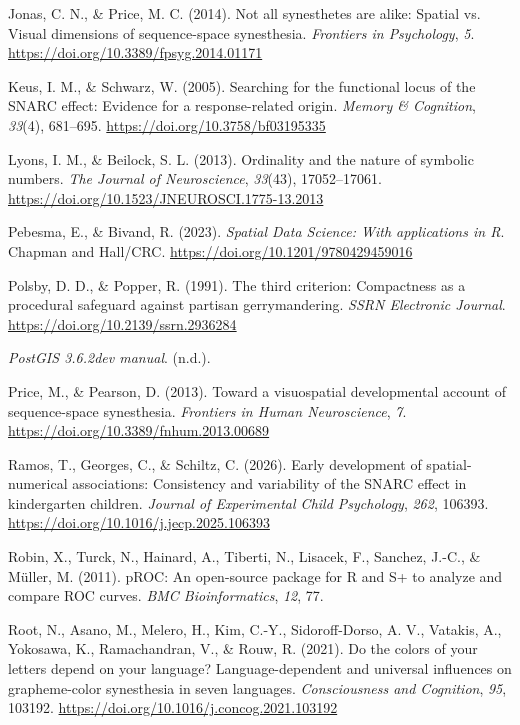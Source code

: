 \documentclass[
  man,
  floatsintext,
  longtable,
  a4paper,
  nolmodern,
  notxfonts,
  notimes,
  colorlinks=true,linkcolor=blue,citecolor=blue,urlcolor=blue]{apa7}
\newlength{\cslhangindent}
\newenvironment{CSLReferences}[2] %
 {\begin{list}{}{%
  \setlength{\itemindent}{0pt}
  \setlength{\leftmargin}{0pt}
  \setlength{\parsep}{0pt}
  \ifodd #1
   \setlength{\leftmargin}{\cslhangindent}
   \setlength{\itemindent}{-1\cslhangindent}
  \fi
  \setlength{\itemsep}{#2\baselineskip}}}
 {\end{list}}
\begin{document}
\begin{CSLReferences}{1}{0}
Jonas, C. N., \& Price, M. C. (2014). Not all synesthetes are alike:
Spatial vs. Visual dimensions of sequence-space synesthesia.
\emph{Frontiers in Psychology}, \emph{5}.
\url{https://doi.org/10.3389/fpsyg.2014.01171}

Keus, I. M., \& Schwarz, W. (2005). Searching for the functional locus
of the SNARC effect: Evidence for a response-related origin.
\emph{Memory \& Cognition}, \emph{33}(4), 681--695.
\url{https://doi.org/10.3758/bf03195335}

Lyons, I. M., \& Beilock, S. L. (2013). Ordinality and the nature of
symbolic numbers. \emph{The Journal of Neuroscience}, \emph{33}(43),
17052--17061. \url{https://doi.org/10.1523/JNEUROSCI.1775-13.2013}

Pebesma, E., \& Bivand, R. (2023). \emph{{Spatial Data Science: With
applications in {R}}}. {Chapman and Hall/CRC}.
\url{https://doi.org/10.1201/9780429459016}

Polsby, D. D., \& Popper, R. (1991). The third criterion: Compactness as
a procedural safeguard against partisan gerrymandering. \emph{SSRN
Electronic Journal}. \url{https://doi.org/10.2139/ssrn.2936284}

\emph{PostGIS 3.6.2dev manual}. (n.d.).

Price, M., \& Pearson, D. (2013). Toward a visuospatial developmental
account of sequence-space synesthesia. \emph{Frontiers in Human
Neuroscience}, \emph{7}. \url{https://doi.org/10.3389/fnhum.2013.00689}

Ramos, T., Georges, C., \& Schiltz, C. (2026). Early development of
spatial-numerical associations: Consistency and variability of the SNARC
effect in kindergarten children. \emph{Journal of Experimental Child
Psychology}, \emph{262}, 106393.
\url{https://doi.org/10.1016/j.jecp.2025.106393}

Robin, X., Turck, N., Hainard, A., Tiberti, N., Lisacek, F., Sanchez,
J.-C., \& Müller, M. (2011). {pROC}: An open-source package for {R} and
{S}+ to analyze and compare ROC curves. \emph{BMC Bioinformatics},
\emph{12}, 77.

Root, N., Asano, M., Melero, H., Kim, C.-Y., Sidoroff-Dorso, A. V.,
Vatakis, A., Yokosawa, K., Ramachandran, V., \& Rouw, R. (2021). Do the
colors of your letters depend on your language? Language-dependent and
universal influences on grapheme-color synesthesia in seven languages.
\emph{Consciousness and Cognition}, \emph{95}, 103192.
\url{https://doi.org/10.1016/j.concog.2021.103192}


\end{CSLReferences}
\end{document}
